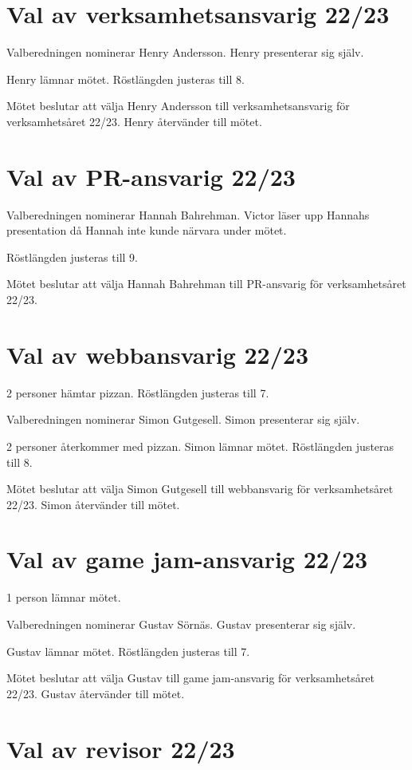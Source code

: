 \documentclass[a4paper]{article}
\begin{document}
\section{Val av verksamhetsansvarig 22/23}

Valberedningen nominerar Henry Andersson. Henry presenterar sig själv.

Henry lämnar mötet. Röstlängden justeras till 8.

Mötet beslutar att välja Henry Andersson till verksamhetsansvarig för
verksamhetsåret 22/23. Henry återvänder till mötet.

\section{Val av PR-ansvarig 22/23}

Valberedningen nominerar Hannah Bahrehman. Victor läser upp Hannahs presentation då Hannah
inte kunde närvara under mötet.

Röstlängden justeras till 9.

Mötet beslutar att välja Hannah Bahrehman till PR-ansvarig för verksamhetsåret 22/23.

\section{Val av webbansvarig 22/23}

2 personer hämtar pizzan. Röstlängden justeras till 7.

Valberedningen nominerar Simon Gutgesell. Simon presenterar sig själv.

2 personer återkommer med pizzan. Simon lämnar mötet. Röstlängden justeras till
8.

Mötet beslutar att välja Simon Gutgesell till webbansvarig för verksamhetsåret 22/23.
Simon återvänder till mötet.

\section{Val av game jam-ansvarig 22/23}

1 person lämnar mötet.

Valberedningen nominerar Gustav Sörnäs. Gustav presenterar sig själv.

Gustav lämnar mötet. Röstlängden justeras till 7.

Mötet beslutar att välja Gustav till game jam-ansvarig för verksamhetsåret
22/23. Gustav återvänder till mötet.

\section{Val av revisor 22/23}
\end{document}
